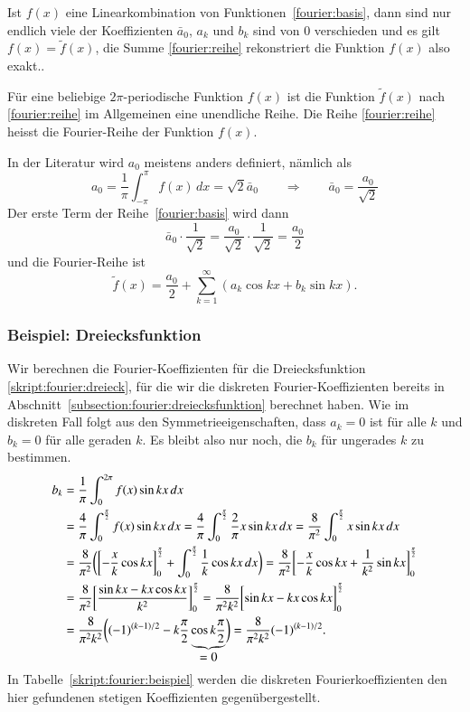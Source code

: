 Ist $f(x)$ eine Linearkombination von Funktionen~\eqref{fourier:basis},
dann sind nur endlich viele der Koeffizienten $\bar{a}_0$, $a_k$ und $b_k$
sind von $0$ verschieden und es gilt $f(x)=\tilde f(x)$, die Summe
\eqref{fourier:reihe} rekonstriert die Funktion $f(x)$ also exakt..

Für eine beliebige $2\pi$-periodische Funktion $f(x)$ ist die Funktion
$\tilde f(x)$ nach \eqref{fourier:reihe} im Allgemeinen eine unendliche
Reihe.
Die Reihe \eqref{fourier:reihe} heisst die Fourier-Reihe der Funktion 
$f(x)$.

In der Literatur wird $a_0$ meistens anders definiert, nämlich als
\[
a_0 = \frac1{\pi}\int_{-\pi}^{\pi} f(x)\,dx = \sqrt{2}\bar{a}_0
\qquad\Rightarrow\qquad
\bar{a}_0 = \frac{a_0}{\sqrt{2}}
\]
Der erste Term der Reihe~\eqref{fourier:basis} wird dann
\[
\bar{a}_0\cdot\frac1{\sqrt{2}}
=
\frac{a_0}{\sqrt{2}}\cdot\frac{1}{\sqrt{2}}
=
\frac{a_0}2
\]
und die Fourier-Reihe ist
\begin{equation}
\tilde f(x)
=
\frac{a_0}2
+
\sum_{k=1}^\infty (a_k\cos kx+b_k\sin kx).
\end{equation}

\subsubsection{Beispiel: Dreiecksfunktion}
Wir berechnen die Fourier-Koeffizienten für die Dreiecksfunktion
\eqref{skript:fourier:dreieck}, für die wir die diskreten Fourier-Koeffizienten
bereits in Abschnitt~\ref{subsection:fourier:dreiecksfunktion}
berechnet haben.
Wie im diskreten Fall folgt aus den Symmetrieeigenschaften, dass $a_k=0$
ist für alle $k$ und $b_k=0$ für alle geraden $k$.
Es bleibt also nur noch, die $b_k$ für ungerades $k$ zu bestimmen.
\begin{align}
b_k
&=
\frac{1}{\pi} \int_0^{2\pi} f(x) \sin kx\,dx
\notag
\\
&=
\frac{4}{\pi} \int_{0}^{\frac{\pi}2} f(x)\sin kx\,dx
=
\frac{4}{\pi} \int_{0}^{\frac{\pi}2} \frac2{\pi}x\sin kx\,dx
=
\frac{8}{\pi^2} \int_{0}^{\frac{\pi}2} x\sin kx\,dx
\notag
\\
&=
\frac{8}{\pi^2} \biggl(
\biggl[-\frac{x}{k}\cos kx\biggr]_0^{\frac{\pi}2} + \int_{0}^{\frac{\pi}2}\frac{1}{k}\cos kx\,dx
\biggr)
=
\frac{8}{\pi^2}
\biggl[
-\frac{x}{k}\cos kx +\frac{1}{k^2}\sin kx
\biggr]_0^{\frac{\pi}2}
\notag
\\
&=
\frac{8}{\pi^2} \biggl[ \frac{\sin kx - kx\cos kx}{k^2}\biggr]_0^{\frac{\pi}2}
=
\frac{8}{\pi^2 k^2} \biggl[\sin kx - kx\cos kx\biggr]_0^{\frac{\pi}2}
\notag
\\
&=
\frac{8}{\pi^2k^2}\biggl(
(-1)^{(k-1)/2} - k\frac{\pi}2\underbrace{\cos k\frac{\pi}2}_{\displaystyle=0}
\biggr)
=
\frac{8}{\pi^2k^2}(-1)^{(k-1)/2}.
\label{skript:fourier:bkstetig}
\end{align}
In Tabelle~\ref{skript:fourier:beispiel} werden die diskreten
Fourierkoeffizienten den hier gefundenen stetigen Koeffizienten
gegenübergestellt.

